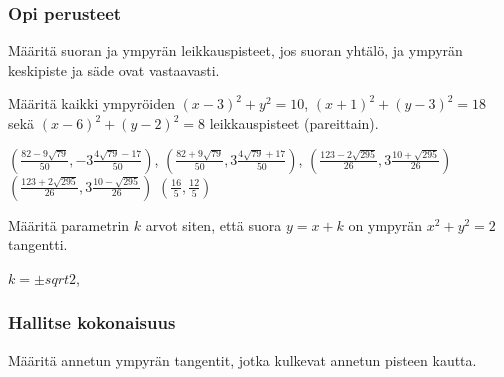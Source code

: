 \begin{tehtavasivu}

\subsubsection*{Opi perusteet}

\begin{tehtava}
Määritä suoran ja ympyrän leikkauspisteet, jos suoran yhtälö, ja ympyrän keskipiste ja säde ovat
vastaavasti.
\begin{vastaus}
\end{vastaus}
\end{tehtava}

\begin{tehtava}
Määritä kaikki ympyröiden $ (x-3)^2+y^2= 10$, $(x+1)^2+(y-3)^2 = 18$ sekä $(x-6)^2+(y-2)^2 = 8$ leikkauspisteet (pareittain).
\begin{vastaus}
$(\frac{82-9\sqrt{79}}{50},-3\frac{4\sqrt{79}-17}{50})$, $(\frac{82+9\sqrt{79}}{50},3\frac{4\sqrt{79}+17}{50})$,
$(\frac{123-2\sqrt{295}}{26}, 3\frac{10+\sqrt{295}}{26})$
$(\frac{123+2\sqrt{295}}{26}, 3\frac{10-\sqrt{295}}{26})$
$(\frac{16}{5}, \frac{12}{5})$
\end{vastaus}
\end{tehtava}

\begin{tehtava}
Määritä parametrin $k$ arvot siten, että suora $y=x+k$ on ympyrän  $ x^2+y^2= 2$ tangentti.
\begin{vastaus}
$k = \pm sqrt{2} $,
\end{vastaus}
\end{tehtava}


\subsubsection*{Hallitse kokonaisuus}
\begin{tehtava}
	Määritä annetun ympyrän tangentit, jotka kulkevat annetun pisteen kautta.
	\begin{vastaus}
	\end{vastaus}
\end{tehtava}


\end{tehtavasivu}
